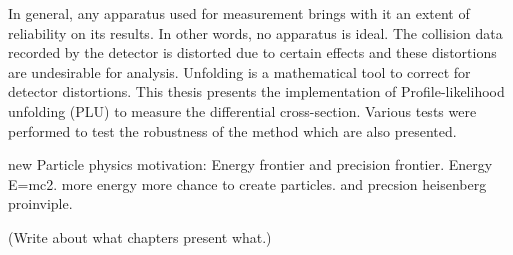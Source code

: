 In general, any apparatus used for measurement brings with it an extent of reliability on its results. In other words, no apparatus is ideal. The collision
data recorded by the detector is distorted due to certain effects and these distortions are undesirable for analysis. Unfolding is a mathematical tool to 
correct for detector distortions. This thesis presents the implementation of Profile-likelihood unfolding (PLU) to measure the differential cross-section. 
Various tests were performed to test the robustness of the method which are also presented. 

new Particle physics motivation: Energy frontier and precision frontier. Energy E=mc2. more energy more chance to create particles. and precsion heisenberg proinviple.

(Write about what chapters present what.)
